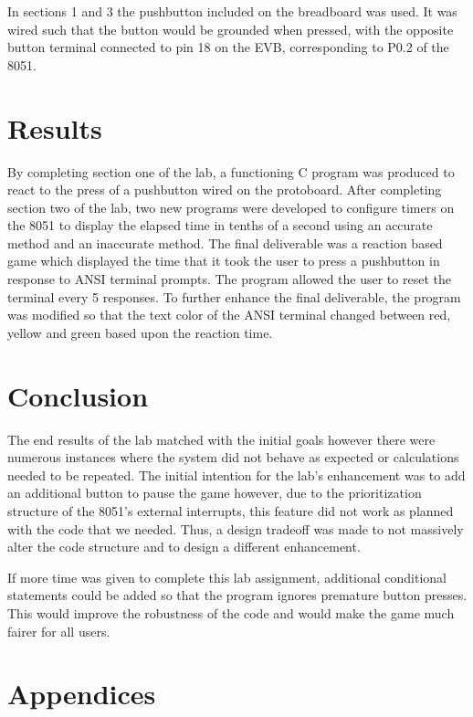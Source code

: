 \documentclass[12pt]{article}
\begin{document}
In sections 1 and 3 the pushbutton included on the breadboard was used. It was wired such that the button would be grounded when pressed, with the opposite button terminal connected to pin 18 on the EVB, corresponding to P0.2 of the 8051.
 
\section{Results}

By completing section one of the lab, a functioning C program was produced to react to the press of a pushbutton wired on the protoboard. After completing section two of the lab, two new programs were developed to configure timers on the 8051 to display the elapsed time in tenths of a second using an accurate method and an inaccurate method. The final deliverable was a reaction based game which displayed the time that it took the user to press a pushbutton in response to ANSI terminal prompts. The program allowed the user to reset the terminal every 5 responses. To further enhance the final deliverable, the program was modified so that the text color of the ANSI terminal changed between red, yellow and green based upon the reaction time. 


\section{Conclusion}

The end results of the lab matched with the initial goals however there were numerous instances where the system did not behave as expected or calculations needed to be repeated. The initial intention for the lab’s enhancement was to add an additional button to pause the game however, due to the prioritization structure of the 8051’s external interrupts, this feature did not work as planned with the code that we needed. Thus, a design tradeoff was made to not massively alter the code structure and to design a different enhancement. 

If more time was given to complete this lab assignment, additional conditional statements could be added so that the program ignores premature button presses. This would improve the robustness of the code and would make the game much fairer for all users. 



\pagebreak
\section{Appendices}
\end{document}
